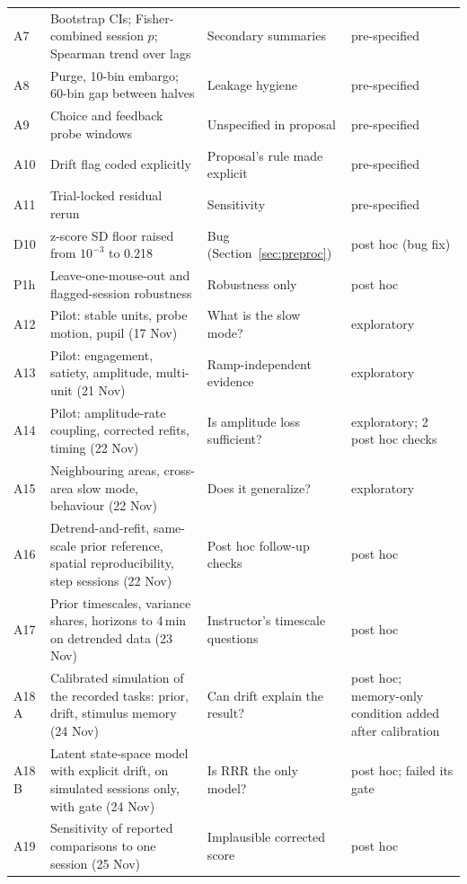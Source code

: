 \documentclass{article}
\begin{document}
\begin{table}[H]
\begin{tabularx}{\linewidth}{@{}l>{\raggedright\arraybackslash}X>{\raggedright\arraybackslash}X>{\raggedright\arraybackslash}p{2.3cm}@{}}
    A7 & Bootstrap CIs; Fisher-combined session $p$; Spearman trend over lags & Secondary summaries & pre-specified \\
    A8 & Purge, 10-bin embargo; 60-bin gap between halves & Leakage hygiene & pre-specified \\
    A9 & Choice and feedback probe windows & Unspecified in proposal & pre-specified \\
    A10 & Drift flag coded explicitly & Proposal's rule made explicit & pre-specified \\
    A11 & Trial-locked residual rerun & Sensitivity & pre-specified \\
    D10 & z-score SD floor raised from $10^{-3}$ to 0.218 & Bug (Section~\ref{sec:preproc}) & post hoc (bug fix) \\
    P1h & Leave-one-mouse-out and flagged-session robustness & Robustness only & post hoc \\
    A12 & Pilot: stable units, probe motion, pupil (17 Nov) & What is the slow mode? & exploratory \\
    A13 & Pilot: engagement, satiety, amplitude, multi-unit (21 Nov) & Ramp-independent evidence & exploratory \\
    A14 & Pilot: amplitude-rate coupling, corrected refits, timing (22 Nov) & Is amplitude loss sufficient? & exploratory; 2 post hoc checks \\
    A15 & Neighbouring areas, cross-area slow mode, behaviour (22 Nov) & Does it generalize? & exploratory \\
    A16 & Detrend-and-refit, same-scale prior reference, spatial reproducibility, step sessions (22 Nov) & Post hoc follow-up checks & post hoc \\
    A17 & Prior timescales, variance shares, horizons to 4\,min on detrended data (23 Nov) & Instructor's timescale questions & post hoc \\
    A18 A & Calibrated simulation of the recorded tasks: prior, drift, stimulus memory (24 Nov) & Can drift explain the result? & post hoc; memory-only condition added after calibration \\
    A18 B & Latent state-space model with explicit drift, on simulated sessions only, with gate (24 Nov) & Is RRR the only model? & post hoc; failed its gate \\
    A19 & Sensitivity of reported comparisons to one session (25 Nov) & Implausible corrected score & post hoc \\
    \bottomrule
  \end{tabularx}
\end{table}
\end{document}
